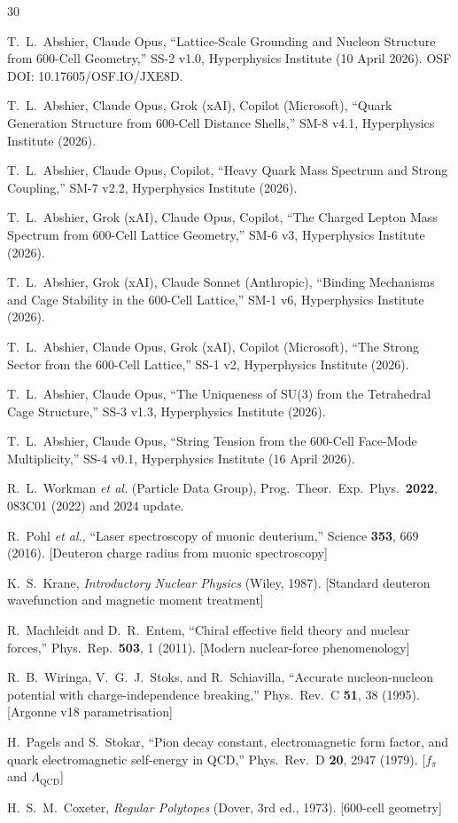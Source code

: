 \documentclass[11pt,letterpaper]{article}
\newcommand{\LQCD}{\Lambda_{\mathrm{QCD}}}
\begin{document}
\begin{thebibliography}{30}

T.~L.~Abshier, Claude Opus, ``Lattice-Scale Grounding and Nucleon Structure from 600-Cell Geometry,'' SS-2 v1.0, Hyperphysics Institute (10 April 2026). OSF DOI: 10.17605/OSF.IO/JXE8D.

T.~L.~Abshier, Claude Opus, Grok (xAI), Copilot (Microsoft), ``Quark Generation Structure from 600-Cell Distance Shells,'' SM-8 v4.1, Hyperphysics Institute (2026).

T.~L.~Abshier, Claude Opus, Copilot, ``Heavy Quark Mass Spectrum and Strong Coupling,'' SM-7 v2.2, Hyperphysics Institute (2026).

T.~L.~Abshier, Grok (xAI), Claude Opus, Copilot, ``The Charged Lepton Mass Spectrum from 600-Cell Lattice Geometry,'' SM-6 v3, Hyperphysics Institute (2026).

T.~L.~Abshier, Grok (xAI), Claude Sonnet (Anthropic), ``Binding Mechanisms and Cage Stability in the 600-Cell Lattice,'' SM-1 v6, Hyperphysics Institute (2026).

T.~L.~Abshier, Claude Opus, Grok (xAI), Copilot (Microsoft), ``The Strong Sector from the 600-Cell Lattice,'' SS-1 v2, Hyperphysics Institute (2026).

T.~L.~Abshier, Claude Opus, ``The Uniqueness of SU(3) from the Tetrahedral Cage Structure,'' SS-3 v1.3, Hyperphysics Institute (2026).

T.~L.~Abshier, Claude Opus, ``String Tension from the 600-Cell Face-Mode Multiplicity,'' SS-4 v0.1, Hyperphysics Institute (16 April 2026).

R.~L.~Workman \emph{et al.} (Particle Data Group), Prog.\ Theor.\ Exp.\ Phys.\ \textbf{2022}, 083C01 (2022) and 2024 update.

R.~Pohl \emph{et al.}, ``Laser spectroscopy of muonic deuterium,'' Science \textbf{353}, 669 (2016). [Deuteron charge radius from muonic spectroscopy]

K.~S.~Krane, \emph{Introductory Nuclear Physics} (Wiley, 1987). [Standard deuteron wavefunction and magnetic moment treatment]

R.~Machleidt and D.~R.~Entem, ``Chiral effective field theory and nuclear forces,'' Phys.\ Rep.\ \textbf{503}, 1 (2011). [Modern nuclear-force phenomenology]

R.~B.~Wiringa, V.~G.~J.~Stoks, and R.~Schiavilla, ``Accurate nucleon-nucleon potential with charge-independence breaking,'' Phys.\ Rev.\ C \textbf{51}, 38 (1995). [Argonne v18 parametrisation]

H.~Pagels and S.~Stokar, ``Pion decay constant, electromagnetic form factor, and quark electromagnetic self-energy in QCD,'' Phys.\ Rev.\ D \textbf{20}, 2947 (1979). [$f_\pi$ and $\LQCD$]

H.~S.~M.~Coxeter, \emph{Regular Polytopes} (Dover, 3rd ed., 1973). [600-cell geometry]

\end{thebibliography}
\end{document}
